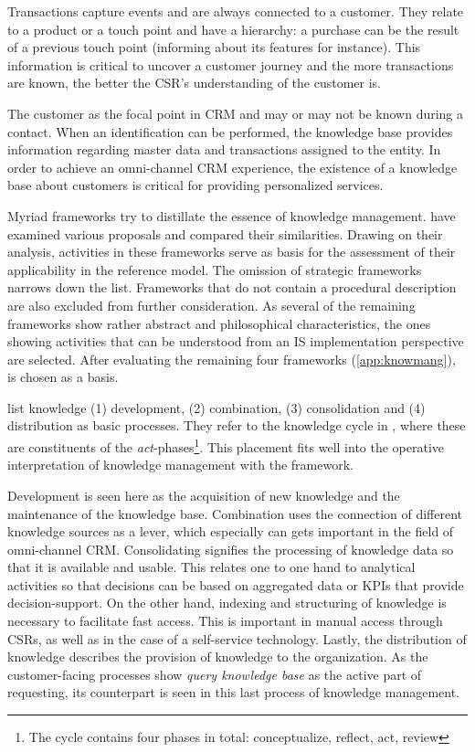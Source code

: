 Transactions capture events and are always connected to a customer. They relate to a product or a touch point and have a hierarchy: a purchase can be the result of a previous touch point (informing about its features for instance). This information is critical to uncover a customer journey and the more transactions are known, the better the \acrshort{CSR}'s understanding of the customer is. 

The customer as the focal point in \acrshort{CRM} and may or may not be known during a contact. When an identification can be performed, the knowledge base provides information regarding master data and transactions assigned to the entity. In order to achieve an omni-channel \acrshort{CRM} experience, the existence of a knowledge base about customers is critical for providing personalized services. 

Myriad frameworks try to distillate  the essence of knowledge management.  \cite{Rubenstein_Montano_2001} have examined various proposals and compared their similarities. Drawing on their analysis, activities in these frameworks serve as basis for the assessment of their applicability in the reference model. The omission of strategic frameworks narrows down the list. Frameworks that do not contain a procedural description are also excluded from further consideration. As several of the remaining frameworks show rather abstract and philosophical characteristics, the ones showing activities that can be understood from an \acrshort{IS} implementation perspective are selected. After evaluating the remaining four frameworks (\cf \ref{app:knowmang}), \citep{van_Heijst_1997} is chosen as a basis.

\citeauthor{van_Heijst_1997} list knowledge (1) development, (2) combination, (3) consolidation and (4) distribution as basic processes. They refer to the knowledge cycle in \citep{Wiig_1997}, where these are constituents of the \textit{act}-phases\footnote{The cycle contains four phases in total: conceptualize, reflect, act, review}. This placement fits well into the operative interpretation of knowledge management with the framework. 

Development is seen here as the acquisition of new knowledge  \citep{van_Heijst_1997} and the maintenance of the knowledge base. Combination uses the connection of different knowledge sources as a lever, which especially can gets important in the field of omni-channel \acrshort{CRM}. Consolidating signifies the processing of knowledge data so that it is available and usable. This relates one to one hand to analytical activities so that decisions can be based on aggregated data or \acrfull{KPI}s that provide decision-support. On the other hand, indexing and structuring of knowledge is necessary to facilitate fast access. This is important in manual access through \acrshort{CSR}s, as well as in the case of a self-service technology. Lastly, the distribution of knowledge describes the provision of knowledge to the organization. As the customer-facing processes show \textit{query knowledge base} as the active part of requesting, its counterpart is seen in this last process of knowledge management. 


